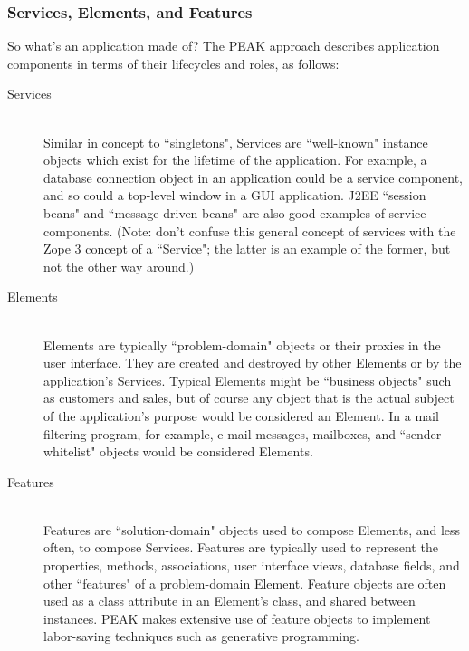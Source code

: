 \vfill






\subsubsection{Services, Elements, and Features}

So what's an application made of?  The PEAK approach describes application
components in terms of their lifecycles and roles, as follows:

\begin{description}
\item[Services] \hfill \\ 
Similar in concept to ``singletons", Services are ``well-known" instance objects
which exist for the lifetime of the application.  For example, a database
connection object in an application could be a service component, and so could
a top-level window in a GUI application.  J2EE ``session beans" and
``message-driven beans" are also good examples of service components.  (Note:
don't confuse this general concept of services with the Zope 3 concept of a
``Service"; the latter is an example of the former, but not the other way 
around.)

\item[Elements] \hfill \\ 
Elements are typically ``problem-domain" objects or their proxies in
the user interface.  They are created and destroyed by other Elements or
by the application's Services.  Typical Elements might be ``business objects"
such as customers and sales, but of course any object that is the actual
subject of the application's purpose would be considered an Element.  In a
mail filtering program, for example, e-mail messages, mailboxes, and
``sender whitelist" objects would be considered Elements.

\item[Features] \hfill \\
Features are ``solution-domain" objects used to compose Elements, and less
often, to compose Services.  Features are typically used to represent 
the properties, methods, associations, user interface views, database fields,
and other ``features" of a problem-domain Element.  Feature objects are often
used as a class attribute in an Element's class, and shared between instances.
PEAK makes extensive use of feature objects to implement labor-saving
techniques such as generative programming.

\end{description}

